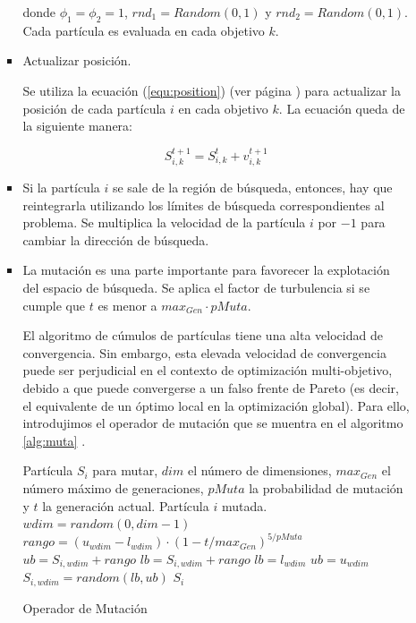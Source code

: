 \begin{enumerate}
\begin{enumerate}
\begin{itemize}
      donde $\phi_1 = \phi_2 = 1$, $rnd_1 = Random(0, 1)$ y $rnd_2 = Random(0, 1)$. Cada part\'icula es evaluada 
      en cada objetivo $k$.
      
      \item Actualizar posici\'on. 
      
      Se utiliza la ecuaci\'on (\ref{equ:position}) (ver p\'agina \pageref{equ:position})
      para actualizar la posici\'on de cada part\'icula $i$ en cada objetivo $k$. La ecuaci\'on queda de la siguiente 
      manera:
      
      \[S^{t+1}_{i,k}=S^{t}_{i,k}+v^{t+1}_{i,k}\]
      
      \item Si la part\'icula $i$ se sale de la regi\'on de b\'usqueda, entonces, hay que reintegrarla utilizando los 
      l\'imites de b\'usqueda correspondientes al problema. Se multiplica la velocidad de la part\'icula $i$ por $-1$ 
      para cambiar la direcci\'on de b\'usqueda.  
      
      \item La mutaci\'on es una parte importante para favorecer la explotaci\'on del espacio de b\'usqueda.
      Se aplica el factor de turbulencia si se cumple que $t$ es menor a $max_{Gen} \cdot pMuta$.

    El algoritmo de c\'umulos de part\'iculas tiene una alta velocidad de convergencia. Sin embargo, esta elevada
    velocidad de convergencia puede ser perjudicial en el contexto de optimizaci\'on multi-objetivo, debido
    a que puede convergerse a un falso frente de Pareto (es decir, el equivalente de un \'optimo local en la 
    optimizaci\'on global). Para ello, introdujimos el operador de mutaci\'on que se muentra en el algoritmo \ref{alg:muta} 
    \cite{Coello04}.

    \begin{algorithm}
      \begin{algorithmic}[1]			
	\REQUIRE  Part\'icula $S_i$ para mutar, $dim$ el n\'umero de dimensiones, $max_{Gen}$ el n\'umero m\'aximo de generaciones,
	      $pMuta$ la probabilidad de mutaci\'on y $t$ la generaci\'on actual.
	\ENSURE Part\'icula $i$ mutada.
	  \STATE $wdim = random(0, dim-1)$
	  \STATE $rango = \left(u_{wdim} - l_{wdim}\right)\cdot \left(1 - t/max_{Gen} \right)^{5/pMuta}$
	  \STATE $ub = S_{i,wdim} + rango$
	  \STATE $lb = S_{i,wdim} + rango$
	    \STATE $lb = l_{wdim}$
	  \ENDIF
	    \STATE $ub = u_{wdim}$
	  \ENDIF
	  \STATE $S_{i,wdim} = random\left(lb,ub\right)$
	\ENDIF	
	\RETURN $S_i$
  \end{algorithmic}
  \caption{Operador de Mutaci\'on}
  \label{alg:muta}
  \end{algorithm}


\end{itemize}
\end{enumerate}
\end{enumerate}
